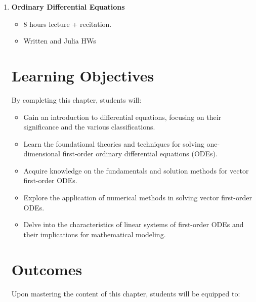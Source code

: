 \documentclass[letterpaper]{book}
\begin{document}
\begin{enumerate}[label={\large\arabic*}, font=\large]
\bigskip


\item {\Large \bf Ordinary Differential Equations}
\begin{itemize}
    \item 8 hours lecture + recitation.
    \item Written and Julia HWs
\end{itemize}

\section*{Learning Objectives}By completing this chapter, students will:

\begin{itemize}
\item Gain an introduction to differential equations, focusing on their significance and the various classifications.
\item Learn the foundational theories and techniques for solving one-dimensional first-order ordinary differential equations (ODEs).
\item Acquire knowledge on the fundamentals and solution methods for vector first-order ODEs.
\item Explore the application of numerical methods in solving vector first-order ODEs.
\item Delve into the characteristics of linear systems of first-order ODEs and their implications for mathematical modeling.
\end{itemize}

\section*{Outcomes}
Upon mastering the content of this chapter, students will be equipped to:


\end{enumerate}
\end{document}
